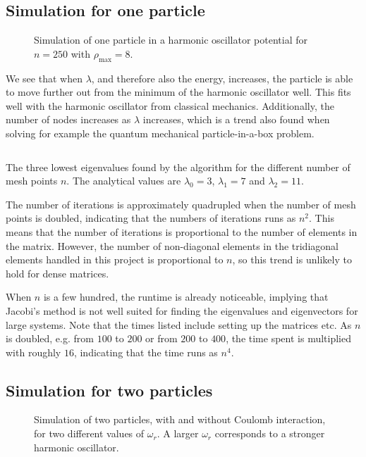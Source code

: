 \documentclass[12pt,english,a4paper]{report}
\begin{document}
\subsection{Simulation for one particle}
\begin{figure}[H]
\centering

\caption{Simulation of one particle in a harmonic oscillator potential for \(n=250\) with \(\rho_{\max}=8\).}\label{fig:en}
\end{figure}
We see that when \(\lambda\), and therefore also the energy, increases, the particle is able to move further out from the minimum of the harmonic oscillator well. This fits well with the harmonic oscillator from classical mechanics. Additionally, the number of nodes increases as \(\lambda\) increases, which is a trend also found when solving for example the quantum mechanical particle-in-a-box problem.

\begin{table}[H]
\[

\]
\caption{The three lowest eigenvalues found by the algorithm for the different number of mesh points \(n\). The analytical values are \(\lambda_0=3\), \(\lambda_1=7\) and \(\lambda_2=11\).}
\end{table}
The number of iterations is approximately quadrupled when the number of mesh points is doubled, indicating that the numbers of iterations runs as \(n^2\). This means that the number of iterations is proportional to the number of elements in the matrix. However, the number of non-diagonal elements in the tridiagonal elements handled in this project is proportional to \(n\), so this trend is unlikely to hold for dense matrices.

When \(n\) is a few hundred, the runtime is already noticeable, implying that Jacobi's method is not well suited for finding the eigenvalues and eigenvectors for large systems. Note that the times listed include setting up the matrices etc. As \(n\) is doubled, e.g. from \(100\) to \(200\) or from \(200\) to \(400\), the time spent is multiplied with roughly \(16\), indicating that the time runs as \(n^4\).


\subsection{Simulation for two particles}
\begin{figure}[H]
\centering

\caption{Simulation of two particles, with and without Coulomb interaction, for two different values of \(\omega_r\). A larger \(\omega_r\) corresponds to a stronger harmonic oscillator.}\label{fig:to}
\end{figure}
\end{document}
